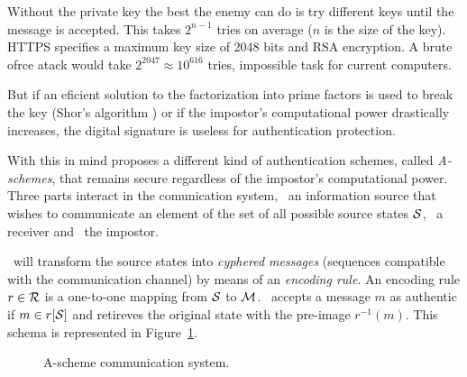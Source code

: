 \documentclass[conference]{IEEEtran}
\begin{document}
Without the private key the best the enemy can do is try different keys until the message is accepted. This takes $2^{n-1}$ tries on average ($n$ is the size of the key). HTTPS specifies a maximum key size of 2048 bits and RSA encryption. A brute ofrce atack would take $2^{2047} \approx 10^{616}$ tries, impossible task for current computers.

But if an eficient solution to the factorization into prime factors is used to break the key (Shor's algorithm \cite{b1}) or if the impostor's computational power drastically increases, the digital signature is useless for authentication protection.

With this in mind \cite{b2} proposes a different kind of authentication schemes, called \textit{A-schemes}, that remains secure regardless of the impostor's computational power. Three parts interact in the comunication system, \A\ an information source that wishes to communicate an element of the set of all possible source states $\mathcal S$, \B\ a receiver and \E\ the impostor.

\A\ will transform the source states into \textit{cyphered messages} (sequences compatible with the communication channel) by means of an \textit{encoding rule}. An encoding rule $r\in\mathcal R$ is a one-to-one mapping from $\mathcal S$ to $\mathcal M$. \B\ accepts a message $m$ as authentic if $m\in r[\mathcal S]$ and retireves the original state with the pre-image $r^{-1}(m)$. This schema is represented in Figure~\ref{figModelo3Participantes}.

\begin{figure}
    \centering
    \caption{A-scheme communication system.}
    \label{figModelo3Participantes}
\end{figure}
\end{document}

